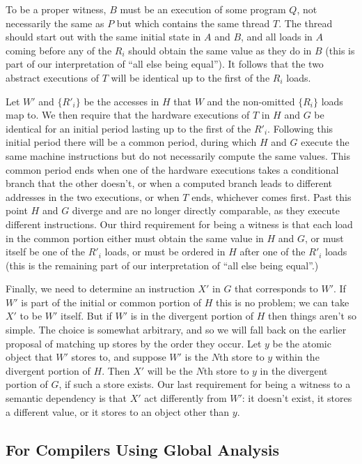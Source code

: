 \documentclass[10]{article}
\begin{document}
To be a proper witness, $B$ must be an execution of some program $Q$,
not necessarily the same as $P$ but which contains the same thread $T$.
The thread should start out with the same initial state in $A$ and
$B$, and all loads in $A$ coming before any of the $R_i$ should obtain
the same value as they do in $B$ (this is part of our interpretation
of ``all else being equal'').
It follows that the two abstract executions of $T$ will be identical
up to the first of the $R_i$ loads.

Let $W'$ and $\{R'_i\}$ be the accesses in $H$ that $W$ and the
non-omitted $\{R_i\}$ loads map to.
We then require that the hardware executions of $T$ in $H$ and $G$ be
identical for an initial period lasting up to the first of the $R'_i$.
Following this initial period there will be a common period, during
which $H$ and $G$ execute the same machine instructions but do not
necessarily compute the same values.
This common period ends when one of the hardware executions
takes a conditional branch that the other doesn't, or when a computed
branch leads to different addresses in the two executions, or when $T$
ends, whichever comes first.
Past this point $H$ and $G$ diverge and are no longer directly
comparable, as they execute different instructions.
Our third requirement for being a witness is that each load in the
common portion either must obtain the same value in $H$ and $G$, or
must itself be one of the $R'_i$ loads, or must be ordered in $H$
after one of the $R'_i$ loads (this is the remaining part of our
interpretation of ``all else being equal''.)

Finally, we need to determine an instruction $X'$ in $G$ that
corresponds to $W'$.
If $W'$ is part of the initial or common portion of $H$ this is no
problem; we can take $X'$ to be $W'$ itself.
But if $W'$ is in the divergent portion of $H$ then things aren't so
simple.
The choice is somewhat arbitrary, and so we will fall back on the
earlier proposal of matching up stores by the order they occur.
Let $y$ be the atomic object that $W'$ stores to, and suppose $W'$
is the $N$th store to $y$ within the divergent portion of $H$.
Then $X'$ will be the $N$th store to $y$ in the divergent portion
of $G$, if such a store exists.
Our last requirement for being a witness to a semantic dependency
is that $X'$ act differently from $W'$: it doesn't exist, it stores
a different value, or it stores to an object other than $y$.

\subsection{For Compilers Using Global Analysis}
\label{sec:For Compilers Using Global Analysis}
\end{document}
